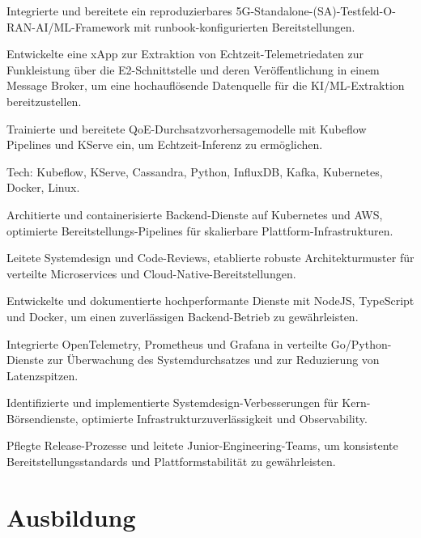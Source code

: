 \documentclass[10pt,a4paper]{resume}
\begin{document}
\bullets
  \item Integrierte und bereitete ein reproduzierbares 5G-Standalone-(SA)-Testfeld-O-RAN-AI/ML-Framework mit runbook-konfigurierten Bereitstellungen.
  \item Entwickelte eine xApp zur Extraktion von Echtzeit-Telemetriedaten zur Funkleistung über die E2-Schnittstelle und deren Veröffentlichung in einem Message Broker, um eine hochauflösende Datenquelle für die KI/ML-Extraktion bereitzustellen.
  \item Trainierte und bereitete QoE-Durchsatzvorhersagemodelle mit Kubeflow Pipelines und KServe ein, um Echtzeit-Inferenz zu ermöglichen.
  \item Tech: Kubeflow, KServe, Cassandra, Python, InfluxDB, Kafka, Kubernetes, Docker, Linux.
\bulletsend
\vspace{1.5pt}
\bullets
  \item Architierte und containerisierte Backend-Dienste auf Kubernetes und AWS, optimierte Bereitstellungs-Pipelines für skalierbare Plattform-Infrastrukturen.
  \item Leitete Systemdesign und Code-Reviews, etablierte robuste Architekturmuster für verteilte Microservices und Cloud-Native-Bereitstellungen.
  \item Entwickelte und dokumentierte hochperformante Dienste mit NodeJS, TypeScript und Docker, um einen zuverlässigen Backend-Betrieb zu gewährleisten.
\bulletsend
\vspace{1.5pt}
\bullets
  \item Integrierte OpenTelemetry, Prometheus und Grafana in verteilte Go/Python-Dienste zur Überwachung des Systemdurchsatzes und zur Reduzierung von Latenzspitzen.
  \item Identifizierte und implementierte Systemdesign-Verbesserungen für Kern-Börsendienste, optimierte Infrastrukturzuverlässigkeit und Observability.
  \item Pflegte Release-Prozesse und leitete Junior-Engineering-Teams, um konsistente Bereitstellungsstandards und Plattformstabilität zu gewährleisten.
\bulletsend
\vspace{1.5pt}

\section{Ausbildung}
\end{document}
